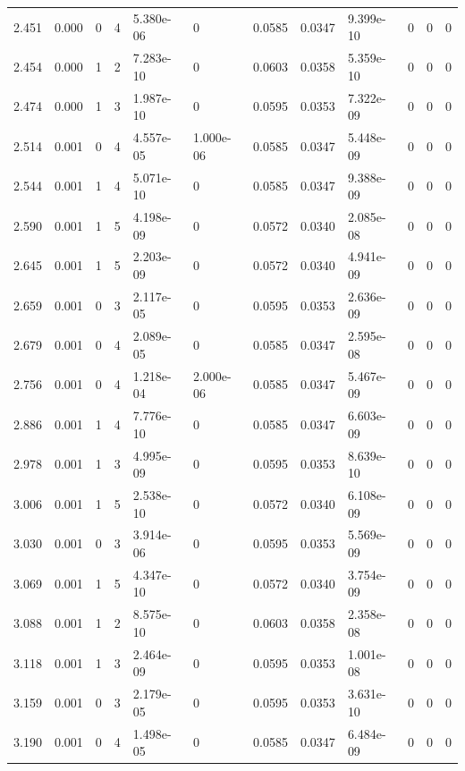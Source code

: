 \documentclass[preview]{standalone}
\begin{document}
{{{\begin{tabular}{L{1.2cm}C{1.2cm} C{0.3cm}C{0.5cm} C{1.4cm}C{1.4cm} C{1.4cm}C{1.4cm} C{1.6cm}C{1.6cm} C{1.6cm}C{1.6cm}}
  2.451  &  0.000  & 0     &  4 &  5.380e-06  & 0  &  0.0585&   0.0347& 9.399e-10 & 0   &  0 & 0  \\ 
  2.454  &  0.000  & 1     &  2 &  7.283e-10  & 0  &  0.0603&   0.0358& 5.359e-10 & 0   &  0 & 0  \\ 
  2.474  &  0.000  & 1     &  3 &  1.987e-10  & 0  &  0.0595&   0.0353& 7.322e-09 & 0   &  0 & 0  \\ 
  2.514  &  0.001  & 0     &  4 &  4.557e-05  & 1.000e-06  &  0.0585&   0.0347& 5.448e-09 & 0   &  0 & 0  \\ 
  2.544  &  0.001  & 1     &  4 &  5.071e-10  & 0  &  0.0585&   0.0347& 9.388e-09 & 0   &  0 & 0  \\ 
  2.590  &  0.001  & 1     &  5 &  4.198e-09  & 0  &  0.0572&   0.0340& 2.085e-08 & 0   &  0 & 0  \\ 
  2.645  &  0.001  & 1     &  5 &  2.203e-09  & 0  &  0.0572&   0.0340& 4.941e-09 & 0   &  0 & 0  \\ 
  2.659  &  0.001  & 0     &  3 &  2.117e-05  & 0  &  0.0595&   0.0353& 2.636e-09 & 0   &  0 & 0  \\ 
  2.679  &  0.001  & 0     &  4 &  2.089e-05  & 0  &  0.0585&   0.0347& 2.595e-08 & 0   &  0 & 0  \\ 
  2.756  &  0.001  & 0     &  4 &  1.218e-04  & 2.000e-06  &  0.0585&   0.0347& 5.467e-09 & 0   &  0 & 0  \\ 
  2.886  &  0.001  & 1     &  4 &  7.776e-10  & 0  &  0.0585&   0.0347& 6.603e-09 & 0   &  0 & 0  \\ 
  2.978  &  0.001  & 1     &  3 &  4.995e-09  & 0  &  0.0595&   0.0353& 8.639e-10 & 0   &  0 & 0  \\ 
  3.006  &  0.001  & 1     &  5 &  2.538e-10  & 0  &  0.0572&   0.0340& 6.108e-09 & 0   &  0 & 0  \\ 
  3.030  &  0.001  & 0     &  3 &  3.914e-06  & 0  &  0.0595&   0.0353& 5.569e-09 & 0   &  0 & 0  \\ 
  3.069  &  0.001  & 1     &  5 &  4.347e-10  & 0  &  0.0572&   0.0340& 3.754e-09 & 0   &  0 & 0  \\ 
  3.088  &  0.001  & 1     &  2 &  8.575e-10  & 0  &  0.0603&   0.0358& 2.358e-08 & 0   &  0 & 0  \\ 
  3.118  &  0.001  & 1     &  3 &  2.464e-09  & 0  &  0.0595&   0.0353& 1.001e-08 & 0   &  0 & 0  \\ 
  3.159  &  0.001  & 0     &  3 &  2.179e-05  & 0  &  0.0595&   0.0353& 3.631e-10 & 0   &  0 & 0  \\ 
  3.190  &  0.001  & 0     &  4 &  1.498e-05  & 0  &  0.0585&   0.0347& 6.484e-09 & 0   &  0 & 0  \\ 

\end{tabular}}}}
\end{document}
